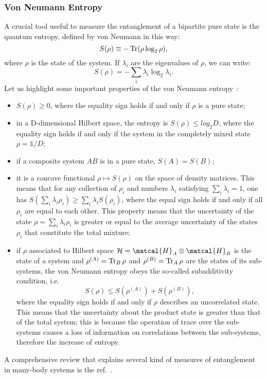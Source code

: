 \subsubsection{Von Neumann Entropy}
A crucial tool useful to measure the entanglement of a bipartite pure state is the quantum entropy, defined by von Neumann in this way:
\begin{equation}
    S(\rho) \equiv -\operatorname{Tr} ( \rho \log_2\rho),
\end{equation}
where $\rho$ is the state of the system. If $\lambda_i$ are the eigenvalues of $\rho$, we can write:
\begin{equation*}
    S(\rho) = -\sum_i \lambda_i \log_2 \lambda_i.
\end{equation*}
Let us highlight some important properties of the von Neumann entropy~\cite{nielsen_chuang, pet_breuer:open_quantum}:
\begin{itemize}
    \item $S(\rho) \geq 0$, where the equality sign holds if and only if $\rho$ is a pure state;
    \item in a D-dimensional Hilbert space, the entropy is $S(\rho) \leq log_2 D$, where the equality sign holds if and only if the system in the completely mixed state $\rho = \mathds{1}/D$;
    \item if a composite system $AB$ is in a pure state, $S(A) = S(B)$;
    \item it is a concave functional $\rho \mapsto S(\rho)$ on the space of density matrices. This means that for any collection of $\rho_i$ and numbers $\lambda_i$ satisfying $\sum_i \lambda_i = 1$, one has $S(\sum_i \lambda_i \rho_i) \geq \sum_i \lambda_i S(\rho_i)$, where the equal sign holds if and only if all $\rho_i$ are equal to each other. This property means that the uncertainty of the state $\rho = \sum_i \lambda_i \rho_i$ is greater or equal to the average uncertainty of the states $\rho_i$ that constitute the total mixture;
    \item if $\rho$ associated to Hilbert space $ \mathcal{H} = \matcal{H}_A \otimes \matcal{H}_B$ is the state of a system and $\rho^{(A)} = \operatorname{Tr}_B \rho$ and $\rho^{(B)} = \operatorname{Tr}_A \rho$ are the states of its sub-systems, the von Neumann entropy obeys the so-called subadditivity condition, i.e.
    \begin{equation*}
        S(\rho) \leq S(\rho^{(A)}) + S(\rho^{(B)}),
    \end{equation*}
    where the equality sign holds if and only if $\rho$ describes an uncorrelated state. This means that the uncertainty about the product state is greater than that of the total system; this is because the operation of trace over the sub-systems causes a loss of information on correlations between the sub-systems, therefore the increase of entropy.
\end{itemize}

A comprehensive review that explains several kind of measures of entanglement in many-body systems is the ref.~\cite{RevModPhys.80.517}.